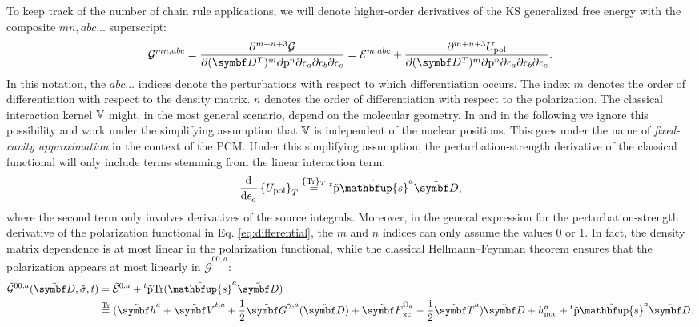 To keep track of the number of chain rule applications,
we will denote higher-order derivatives of the \acrshort*{KS}
generalized free energy with the composite ${mn, abc\ldots}$
superscript:
\begin{equation}\label{eq:differential}
  \mathcal{G}^{mn, abc}
  =
  \frac{\partial^{m+n+3}\mathcal{G}}{\partial(\mat{D}^T)^m\partial\p^n\partial\epsilon_a\partial\epsilon_b\partial\epsilon_c}
  =
    \mathcal{E}^{m, abc} +
  \frac{\partial^{m+n+3}U_\mathrm{pol}}{\partial(\mat{D}^T)^m\partial\p^n\partial\epsilon_a\partial\epsilon_b\partial\epsilon_c} \text{.}
\end{equation}
In this notation, the $abc\ldots$ indices denote the perturbations with
respect to which differentiation occurs. The index $m$ denotes the order
of differentiation with respect to the density matrix. $n$
denotes the order of differentiation with respect to the
polarization.
The classical interaction kernel $\mathbb{V}$ might, in the most general
scenario, depend on the molecular geometry.
In  and in the following we ignore this possibility and work
under the simplifying assumption that $\mathbb{V}$ is independent of the nuclear
positions.
This goes under the name of \emph{fixed-cavity approximation} in the
context of the \acrshort*{PCM}.\autocite{Cammi1994-qj}
Under this simplifying assumption, the perturbation-strength derivative
of the classical functional will only include terms stemming from the
linear interaction term:
\begin{equation}\label{eq:polarization-derivative}
 \deriv{}{\epsilon_a}\left\lbrace
 U_\mathrm{pol}
 \right\rbrace_T
 \eqavetr
 {}^t\tilde{\p}\tilde{\mathbfup{s}}^a\pertmat{D} \text{,}
\end{equation}
where the second term only involves derivatives of the source integrals.
Moreover, in the general expression for the perturbation-strength
derivative of the polarization functional in Eq. \eqref{eq:differential},
the $m$ and $n$ indices can only assume the values 0 or 1.
In fact, the density matrix dependence is at most linear in the
polarization functional, while the classical Hellmann--Feynman theorem
ensures that the polarization appears at most linearly in $\tilde{\mathcal{G}}^{00,a}$:
\begin{equation}\label{eq:tilde-G00-a}
  \begin{aligned}
    \tilde{\mathcal{G}}^{00,a}(\tilde{\mat{D}}, \tilde{\sigma}, t)
    &= \tilde{\mathcal{E}}^{0,a} +
    {}^t\tilde{\p}\Tr({\tilde{\mathbfup{s}}^a\pertmat{D}}) \\
  &\eqtr
  (\pertmat{h}^a + \pertmat{V}^{t,a} + \frac{1}{2}\pertmat{G}^{\gamma, a}(\pertmat{D}) + \pertmat{F}^{\Omega_a}_\mathrm{xc}
  -\frac{\mathrm{i}}{2}\pertmat{T}^a)\pertmat{D}
  + h_\mathrm{nuc}^a + {}^t\tilde{\p}\tilde{\mathbfup{s}}^a\pertmat{D}.
  \end{aligned}
\end{equation}
